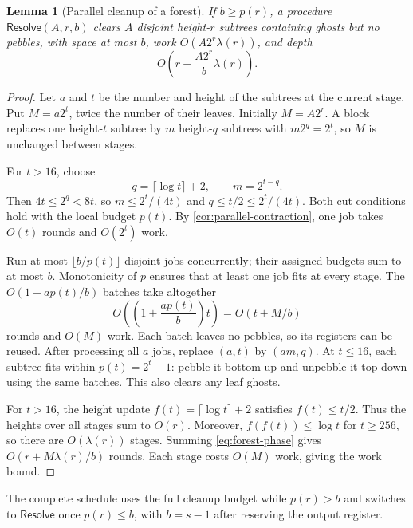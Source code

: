 \documentclass[11pt]{article}
\newtheorem{lemma}[lemma]{Lemma}
\theoremstyle{definition}
\theoremstyle{remark}
\newcommand{\Resolve}{\mathsf{Resolve}}
\begin{document}
\begin{lemma}[Parallel cleanup of a forest]
\label{lem:resolver}
If $b\ge p(r)$, a procedure $\Resolve(A,r,b)$ clears $A$ disjoint height-$r$ subtrees containing ghosts but no pebbles, with space at most $b$, work $O(A2^r\lambda(r))$, and depth
\begin{equation}
O\!\left(r+\frac{A2^r}{b}\lambda(r)\right).
\label{eq:forest-cleanup}
\end{equation}
\end{lemma}
\begin{proof}
Let $a$ and $t$ be the number and height of the subtrees at the current stage. Put $M=a2^t$, twice the number of their leaves. Initially $M=A2^r$. A block replaces one height-$t$ subtree by $m$ height-$q$ subtrees with $m2^q=2^t$, so $M$ is unchanged between stages.

For $t>16$, choose
\begin{equation}
q=\lceil\log t\rceil+2, \qquad m=2^{t-q}.
\label{eq:resolver-cut}
\end{equation}
Then $4t\le2^q<8t$, so $m\le2^t/(4t)$ and $q\le t/2\le2^t/(4t)$. Both cut conditions hold with the local budget $p(t)$. By \cref{cor:parallel-contraction}, one job takes $O(t)$ rounds and $O(2^t)$ work.

Run at most $\lfloor b/p(t)\rfloor$ disjoint jobs concurrently; their assigned budgets sum to at most $b$. Monotonicity of $p$ ensures that at least one job fits at every stage. The $O(1+ap(t)/b)$ batches take altogether
\begin{equation}
O\!\left(\left(1+\frac{ap(t)}b\right)t\right)=O(t+M/b)
\label{eq:forest-phase}
\end{equation}
rounds and $O(M)$ work. Each batch leaves no pebbles, so its registers can be reused. After processing all $a$ jobs, replace $(a,t)$ by $(am,q)$. At $t\le16$, each subtree fits within $p(t)=2^t-1$: pebble it bottom-up and unpebble it top-down using the same batches. This also clears any leaf ghosts.

For $t>16$, the height update $f(t)=\lceil\log t\rceil+2$ satisfies $f(t)\le t/2$. Thus the heights over all stages sum to $O(r)$. Moreover, $f(f(t))\le\log t$ for $t\ge256$, so there are $O(\lambda(r))$ stages. Summing \cref{eq:forest-phase} gives $O(r+M\lambda(r)/b)$ rounds. Each stage costs $O(M)$ work, giving the work bound.
\end{proof}

The complete schedule uses the full cleanup budget while $p(r)>b$ and switches to $\Resolve$ once $p(r)\le b$, with $b=s-1$ after reserving the output register.
\end{document}
